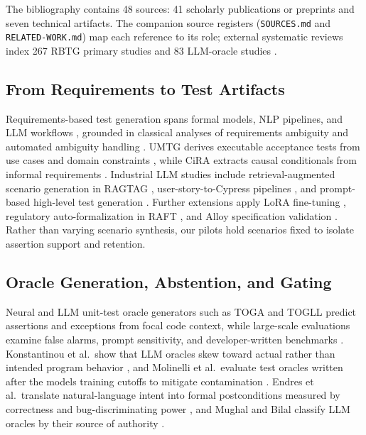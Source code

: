\documentclass[sigconf,nonacm]{acmart}
\begin{document}
The bibliography contains 48 sources: 41 scholarly publications or preprints and seven technical artifacts. The companion source registers (\texttt{SOURCES.md} and \texttt{RELATED-WORK.md}) map each reference to its role; external systematic reviews index 267 RBTG primary studies \cite{rbtgdata} and 83 LLM-oracle studies \cite{mughal2026}.

\subsection{From Requirements to Test Artifacts}
Requirements-based test generation spans formal models, NLP pipelines, and LLM workflows \cite{yang2025,folorunsho2026}, grounded in classical analyses of requirements ambiguity \cite{berry2004} and automated ambiguity handling \cite{ezzini2022}. UMTG derives executable acceptance tests from use cases and domain constraints \cite{wang2022umtg}, while CiRA extracts causal conditionals from informal requirements \cite{fischbach2023}. Industrial LLM studies include retrieval-augmented scenario generation in RAGTAG \cite{arora2024}, user-story-to-Cypress pipelines \cite{ferreira2025}, and prompt-based high-level test generation \cite{masuda2025}. Further extensions apply LoRA fine-tuning \cite{moradi2026}, regulatory auto-formalization in RAFT \cite{xue2026}, and Alloy specification validation \cite{cunha2026}. Rather than varying scenario synthesis, our pilots hold scenarios fixed to isolate assertion support and retention.

\subsection{Oracle Generation, Abstention, and Gating}
Neural and LLM unit-test oracle generators such as TOGA \cite{dinella2022} and TOGLL \cite{togll2025} predict assertions and exceptions from focal code context, while large-scale evaluations examine false alarms, prompt sensitivity, and developer-written benchmarks \cite{hossain2023,bodicoat2025,togbench2026,ouedraogo2024}. Konstantinou et al.\ show that LLM oracles skew toward actual rather than intended program behavior \cite{konstantinou2024}, and Molinelli et al.\ evaluate test oracles written after the models\textquotesingle{} training cutoffs to mitigate contamination \cite{molinelli2025}. Endres et al.\ translate natural-language intent into formal postconditions measured by correctness and bug-discriminating power \cite{endres2024}, and Mughal and Bilal classify LLM oracles by their source of authority \cite{mughal2026}.
\end{document}
